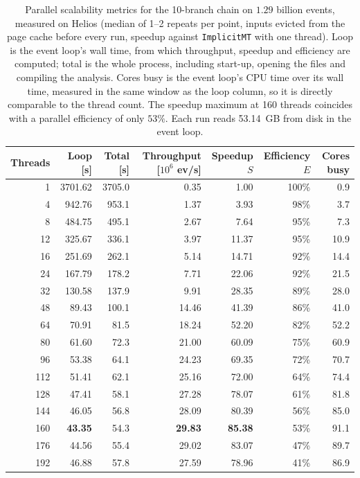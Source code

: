 \begin{table}[htbp]
\centering
\caption{Parallel scalability metrics for the 10-branch chain on $1.29$ billion events, measured on Helios (median of 1--2 repeats per point, inputs evicted from the page cache before every run, speedup against \texttt{ImplicitMT} with one thread). Loop is the event loop's wall time, from which throughput, speedup and efficiency are computed; total is the whole process, including start-up, opening the files and compiling the analysis. Cores busy is the event loop's CPU time over its wall time, measured in the same window as the loop column, so it is directly comparable to the thread count. The speedup maximum at 160 threads coincides with a parallel efficiency of only $53\%$. Each run reads 53.14~GB from disk in the event loop.}
\label{tab:scalability-chain11}
\setlength{\tabcolsep}{5pt}
\begin{tabular}{rrrrrrr}
\toprule
Threads & Loop [s] & Total [s] & Throughput [$10^6$ ev/s] & Speedup $S$ & Efficiency $E$ & Cores busy \\
\midrule
 1 & 3701.62 & 3705.0 & 0.35 & 1.00 & 100\% & 0.9 \\
 4 & 942.76 & 953.1 & 1.37 & 3.93 & 98\% & 3.7 \\
 8 & 484.75 & 495.1 & 2.67 & 7.64 & 95\% & 7.3 \\
12 & 325.67 & 336.1 & 3.97 & 11.37 & 95\% & 10.9 \\
16 & 251.69 & 262.1 & 5.14 & 14.71 & 92\% & 14.4 \\
24 & 167.79 & 178.2 & 7.71 & 22.06 & 92\% & 21.5 \\
32 & 130.58 & 137.9 & 9.91 & 28.35 & 89\% & 28.0 \\
48 & 89.43 & 100.1 & 14.46 & 41.39 & 86\% & 41.0 \\
64 & 70.91 & 81.5 & 18.24 & 52.20 & 82\% & 52.2 \\
80 & 61.60 & 72.3 & 21.00 & 60.09 & 75\% & 60.9 \\
96 & 53.38 & 64.1 & 24.23 & 69.35 & 72\% & 70.7 \\
112 & 51.41 & 62.1 & 25.16 & 72.00 & 64\% & 74.4 \\
128 & 47.41 & 58.1 & 27.28 & 78.07 & 61\% & 81.8 \\
144 & 46.05 & 56.8 & 28.09 & 80.39 & 56\% & 85.0 \\
160 & \textbf{43.35} & 54.3 & \textbf{29.83} & \textbf{85.38} & 53\% & 91.1 \\
176 & 44.56 & 55.4 & 29.02 & 83.07 & 47\% & 89.7 \\
192 & 46.88 & 57.8 & 27.59 & 78.96 & 41\% & 86.9 \\
\bottomrule
\end{tabular}
\end{table}
